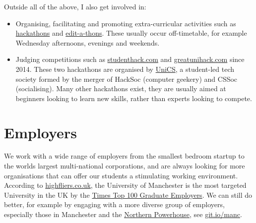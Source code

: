 \documentclass[
  12pt,
]{book}
\providecommand{\tightlist}{%
  \setlength{\itemsep}{0pt}\setlength{\parskip}{0pt}}
\begin{document}
Outside all of the above, I also get involved in:

\begin{itemize}
\tightlist
\item
  Organising, facilitating and promoting extra-curricular activities such as \href{https://en.wikipedia.org/wiki/Hackathon}{hackathons} \citep{Briscoe, Warner2017} and \href{https://en.wikipedia.org/wiki/Edit-a-thon}{edit-a-thons}. \citep{goodbadugly, troubled, findingada2019} These usually occur off-timetable, for example Wednesday afternoons, evenings and weekends.
\item
  Judging competitions such as \href{https://www.studenthack.com}{studenthack.com} and \href{https://greatunihack.com}{greatunihack.com} since 2014. These two hackathons are organised by \href{https://www.unicsmcr.com/}{UniCS}, a student-led tech society formed by the merger of HackSoc (computer geekery) and CSSoc (socialising). Many other hackathons exist, they are usually aimed at beginners looking to learn new skills, rather than experts looking to compete. \citep{Briscoe, hafb}
\end{itemize}

\hypertarget{employers}{%
\chapter{Employers}\label{employers}}

We work with a wide range of employers from the smallest bedroom startup to the worlds largest multi-national corporations, and are always looking for more organisations that can offer our students a stimulating working environment. According to \href{https://www.highfliers.co.uk}{highfliers.co.uk}, the University of Manchester is the most targeted University in the UK by the \href{https://www.top100graduateemployers.com}{Times Top 100 Graduate Employers}. \citep{times100, highfliers2020, Birchall2019} We can still do better, for example by engaging with a more diverse group of employers, especially those in Manchester and the \href{https://northernpowerhouse.gov.uk/}{Northern Powerhouse}, see \href{https://git.io/manc}{git.io/manc}. \citep{gitmanc, londonvstherest, hebdenbridge, manhattanchester, manchattan}
\end{document}
